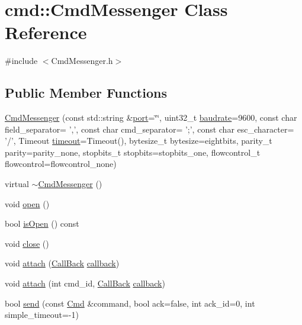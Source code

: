 \hypertarget{classcmd_1_1_cmd_messenger}{\section{cmd\+:\+:Cmd\+Messenger Class Reference}
\label{classcmd_1_1_cmd_messenger}
}


{\ttfamily \#include $<$Cmd\+Messenger.\+h$>$}

\subsection*{Public Member Functions}
\begin{DoxyCompactItemize}
\item 
\hyperlink{classcmd_1_1_cmd_messenger_aba80ae7cc283a24b7afa08c18f89af0f}{Cmd\+Messenger} (const std\+::string \&\hyperlink{interbyte_8cpp_aae3ba4688e12d52dca80a55b5725b29d}{port}=\char`\"{}\char`\"{}, uint32\+\_\+t \hyperlink{interbyte_8cpp_ac4f06ea26ed6bd7ae83b92d64ac10b78}{baudrate}=9600, const char field\+\_\+separator= ',', const char cmd\+\_\+separator= ';', const char esc\+\_\+character= '/', Timeout \hyperlink{interbyte_8cpp_ab5627d8d8b095c198e2523c44ca380ac}{timeout}=Timeout(), bytesize\+\_\+t bytesize=eightbits, parity\+\_\+t parity=parity\+\_\+none, stopbits\+\_\+t stopbits=stopbits\+\_\+one, flowcontrol\+\_\+t flowcontrol=flowcontrol\+\_\+none)
\item 
virtual \hyperlink{classcmd_1_1_cmd_messenger_aa92b483212121faffeb02b7a63450ad0}{$\sim$\+Cmd\+Messenger} ()
\item 
void \hyperlink{classcmd_1_1_cmd_messenger_adb4617437e81ccb39b1d314b83db8f6c}{open} ()
\item 
bool \hyperlink{classcmd_1_1_cmd_messenger_a38dab46f4b3c0c56e8dad6e91b9500c8}{is\+Open} () const 
\item 
void \hyperlink{classcmd_1_1_cmd_messenger_a3a08819cae57dd6c9f7515ebae923696}{close} ()
\item 
void \hyperlink{classcmd_1_1_cmd_messenger_a92df6db7de8ce3d685d4da21b7c76d77}{attach} (\hyperlink{namespacecmd_a20b40ecd3ba46130eef6c125f70c4121}{Call\+Back} \hyperlink{classcallback}{callback})
\item 
void \hyperlink{classcmd_1_1_cmd_messenger_abbc2aa2a6bc95960215eeaa88c4533a4}{attach} (int cmd\+\_\+id, \hyperlink{namespacecmd_a20b40ecd3ba46130eef6c125f70c4121}{Call\+Back} \hyperlink{classcallback}{callback})
\item 
bool \hyperlink{classcmd_1_1_cmd_messenger_a5ea6815a9c6dad49350396839527e25d}{send} (const \hyperlink{namespacecmd_af9b58ca395c80edd1335e21d1b9f4c99}{Cmd} \&command, bool ack=false, int ack\+\_\+id=0, int simple\+\_\+timeout=-\/1)

\end{DoxyCompactItemize}
